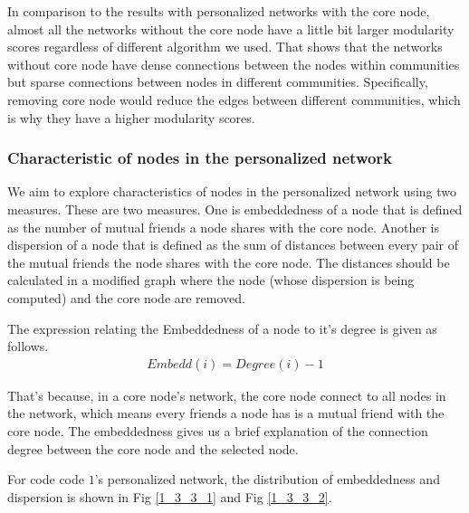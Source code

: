 \documentclass[11pt]{article}
\begin{document}
In comparison to the results with personalized networks with the core node, almost all the networks without the core node have a little bit larger modularity scores regardless of different algorithm we used. That shows that the networks without core node have dense connections between the nodes within communities but sparse connections between nodes in different communities. Specifically, removing core node would reduce the edges between different communities, which is why they have a higher modularity scores.

\subsubsection{Characteristic of nodes in the personalized network}

We aim to explore characteristics of nodes in the personalized network using two measures. These are two measures. One is embeddedness of a node that is defined as the number of mutual friends a node shares with the core node. Another is dispersion of a node that is defined as the sum of distances between every pair of the mutual friends the node shares with the core node. The distances should be calculated in a modified graph where the node (whose dispersion is being computed) and the core node are removed.

The expression relating the Embeddedness of a node to it’s degree is given as follows.
\begin{align}
Embedd(i) = Degree (i) - 1
\end{align}

That's because, in a core node’s network, the core node connect to all nodes in the network, which means every friends a node has is a mutual friend with the core node. The embeddedness gives us a brief explanation of the connection degree between the core node and the selected node. 

For code code $1$’s personalized network, the distribution of embeddedness and dispersion is shown in Fig \ref{1_3_3_1} and Fig \ref{1_3_3_2}.
\end{document}
